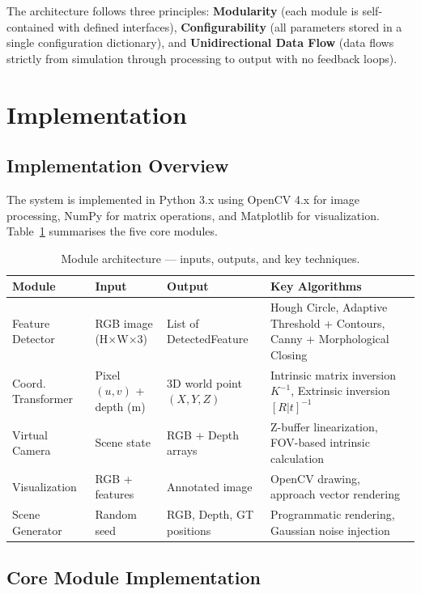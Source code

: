 \documentclass[11pt,a4paper]{article}
\begin{document}
The architecture follows three principles: \textbf{Modularity} (each module is self-contained with defined interfaces), \textbf{Configurability} (all parameters stored in a single configuration dictionary), and \textbf{Unidirectional Data Flow} (data flows strictly from simulation through processing to output with no feedback loops).

\section{Implementation}

\subsection{Implementation Overview}

The system is implemented in Python 3.x using OpenCV 4.x for image processing, NumPy for matrix operations, and Matplotlib for visualization. Table~\ref{tab:modules} summarises the five core modules.

\begin{table}[H]
\centering
\caption{Module architecture --- inputs, outputs, and key techniques.}
\label{tab:modules}
\small
\begin{tabularx}{\textwidth}{l l l X}
\toprule
\textbf{Module} & \textbf{Input} & \textbf{Output} & \textbf{Key Algorithms} \\
\midrule
Feature Detector & RGB image (H$\times$W$\times$3) & List of DetectedFeature & Hough Circle, Adaptive Threshold + Contours, Canny + Morphological Closing \\
Coord. Transformer & Pixel $(u,v)$ + depth (m) & 3D world point $(X,Y,Z)$ & Intrinsic matrix inversion $K^{-1}$, Extrinsic inversion $[R|t]^{-1}$ \\
Virtual Camera & Scene state & RGB + Depth arrays & Z-buffer linearization, FOV-based intrinsic calculation \\
Visualization & RGB + features & Annotated image & OpenCV drawing, approach vector rendering \\
Scene Generator & Random seed & RGB, Depth, GT positions & Programmatic rendering, Gaussian noise injection \\
\bottomrule
\end{tabularx}
\end{table}

\subsection{Core Module Implementation}
\end{document}

